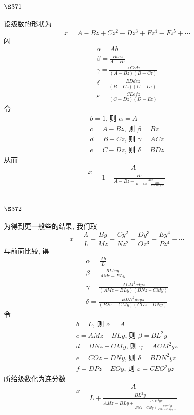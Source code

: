 \section{$\S 371$}

设级数的形状为
\[
x=A-B z+C z^{2}-D z^{3}+E z^{4}-F z^{5}+\cdots
\]
闪
\[
\begin{gathered}
\alpha=A b \\
\beta=\frac{B b c z}{A-B z} \\
\gamma=\frac{A C c d z}{(A-B z)(B-C z)} \\
\delta=\frac{B D d e z}{(B-C z)(C-D z)} \\
\varepsilon=\frac{C E e f z}{(C-D z)(D-E z)}
\end{gathered}
\]
令
\[
\begin{gathered}
b=1 \text {, 则 } \alpha=A \\
c=A-B z \text {, 则 } \beta=B z \\
d=B-C z \text {, 则 } \gamma=A C z \\
e=C-D z \text {, 则 } \delta=B D z
\end{gathered}
\]
从而
\[
x=\frac{A}{1+\frac{B z}{A-B z+\frac{A c z}{B-C z+\frac{B D z}{C-D z+\cdots}}}}
\]
\section{$\S 372$}

为得到更一般些的结果, 我们取
\[
x=\frac{A}{L}-\frac{B y}{M z}+\frac{C y^{2}}{N z^{2}}-\frac{D y^{3}}{O z^{3}}+\frac{E y^{4}}{P z^{4}}-\cdots
\]
与前面比较, 得
\[
\begin{gathered}
\alpha=\frac{A b}{L} \\
\beta=\frac{B L b c y}{A M z-B L y} \\
\gamma=\frac{A C M^{2} c d y z}{(A M z-B L y)(B N z-C M y)} \\
\delta=\frac{B D N^{2} d e y z}{(B N z-C M y)(C O z-D N y)}
\end{gathered}
\]
令
\[
\begin{gathered}
b=L \text {, 则 } \alpha=A \\
c=A M z-B L y \text {, 则 } \beta=B L^{2} y \\
d=B N z-C M y \text {, 则 } \gamma=A C M^{2} y z \\
e=C O z-D N y \text {, 则 } \delta=B D N^{2} y z \\
f=D P z-E O y \text {, 则 } \varepsilon=C E O^{2} y z
\end{gathered}
\]
所给级数化为连分数 
\[
x=\frac{A}{L+\frac{B L^{2} y}{A M z-B L y+\frac{A C M^{2} y z}{B N z-C M y+\frac{B D N^{2} y z}{C O z-D N y+\cdots}}}}
\]
